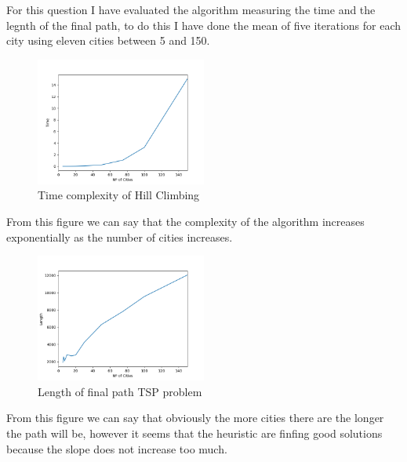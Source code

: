 \documentclass{article}
\begin{document}
        For this question I have evaluated the algorithm measuring the time and the legnth of the final path, to do this I 
        have done the mean of five iterations for each city using eleven cities between 5 and 150.

        \begin{figure}[H]

            \centering
            \includegraphics[width=0.5\textwidth]{../media/01.TSP-cities-time.png}
            \caption{Time complexity of Hill Climbing}
            \label{Time complexity of Hill Climbing}

        \end{figure}

        From this figure we can say that the complexity of the algorithm increases exponentially as the number of cities increases.

        \begin{figure}[H]

            \centering
            \includegraphics[width=0.5\textwidth]{../media/02.TSP-cities-length.png}
            \caption{Length of final path TSP problem}
            \label{Length of final path TSP problem}

        \end{figure}

        From this figure we can say that obviously the more cities there are the longer the path will be, however it seems that the heuristic 
        are finfing good solutions because the slope does not increase too much.
\end{document}
